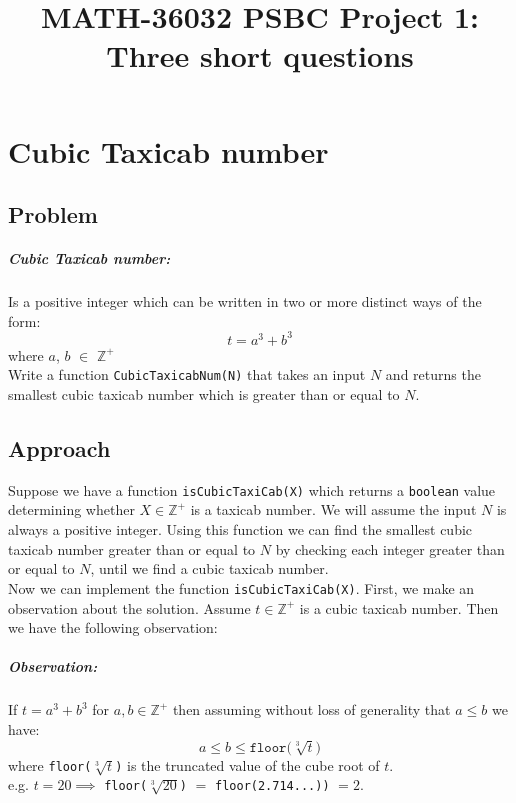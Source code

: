\documentclass[11pt]{report}
\title{MATH-36032 PSBC Project 1: Three short questions}
\begin{document}
\chapter{Cubic Taxicab number}

\section*{Problem}
\paragraph{Cubic Taxicab number:}
Is a positive integer which can be written in two or more distinct ways of the form:
\begin{equation*}
	t = a^3 + b^3
\end{equation*} where $a$, $b$ $\in$ $\mathbb{Z^+}$ \\

Write a function \texttt{CubicTaxicabNum(N)} that takes an input $N$ and returns the smallest cubic taxicab number which is greater than or equal to $N$.

\section{Approach}
Suppose we have a function \texttt{isCubicTaxiCab(X)} which returns a \texttt{boolean} value determining whether $X \in \mathbb{Z^+}$ is a taxicab number. We will assume the input $N$ is always a positive integer. Using this function we can find the smallest cubic taxicab number greater than or equal to $N$ by checking each integer greater than or equal to $N$, until we find a cubic taxicab number. \\



Now we can implement the function \texttt{isCubicTaxiCab(X)}. First, we make an observation about the solution. Assume $t \in \mathbb{Z^+}$ is a cubic taxicab number. Then we have the following observation:

\paragraph{Observation:}
If $t=a^3+b^3$ for $a, b \in \mathbb{Z^+}$ then assuming without loss of generality that $a \leqslant b$ we have:
\begin{equation*}
	a \leqslant b \leqslant \texttt{floor(}\sqrt[3]{t}\texttt{)} 
\end{equation*} where \texttt{floor($\sqrt[3]{t}$)} is the truncated value of the cube root of $t$. \\ 
e.g. $t=20 \implies$ \texttt{floor($\sqrt[3]{20}$)} $=$ \texttt{floor(2.714...))} $=2$. \\
\end{document}
